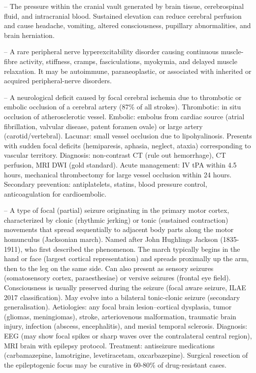 -- The pressure within the cranial vault generated by brain tissue, cerebrospinal fluid, and intracranial blood. Sustained elevation can reduce cerebral perfusion and cause headache, vomiting, altered consciousness, pupillary abnormalities, and brain herniation.

-- A rare peripheral nerve hyperexcitability disorder causing continuous muscle-fibre activity, stiffness, cramps, fasciculations, myokymia, and delayed muscle relaxation. It may be autoimmune, paraneoplastic, or associated with inherited or acquired peripheral-nerve disorders.

-- A neurological deficit caused by focal cerebral ischemia due to thrombotic or embolic occlusion of a cerebral artery (87\% of all strokes). Thrombotic: in situ occlusion of atherosclerotic vessel. Embolic: embolus from cardiac source (atrial fibrillation, valvular disease, patent foramen ovale) or large artery (carotid/vertebral). Lacunar: small vessel occlusion due to lipohyalinosis. Presents with sudden focal deficits (hemiparesis, aphasia, neglect, ataxia) corresponding to vascular territory. Diagnosis: non-contrast CT (rule out hemorrhage), CT perfusion, MRI DWI (gold standard). Acute management: IV tPA within 4.5 hours, mechanical thrombectomy for large vessel occlusion within 24 hours. Secondary prevention: antiplatelets, statins, blood pressure control, anticoagulation for cardioembolic.

-- A type of focal (partial) seizure originating in the primary motor cortex, characterized by clonic (rhythmic jerking) or tonic (sustained contraction) movements that spread sequentially to adjacent body parts along the motor homunculus (Jacksonian march). Named after John Hughlings Jackson (1835-1911), who first described the phenomenon. The march typically begins in the hand or face (largest cortical representation) and spreads proximally up the arm, then to the leg on the same side. Can also present as sensory seizures (somatosensory cortex, paraesthesiae) or versive seizures (frontal eye field). Consciousness is usually preserved during the seizure (focal aware seizure, ILAE 2017 classification). May evolve into a bilateral tonic-clonic seizure (secondary generalisation). Aetiologies: any focal brain lesion--cortical dysplasia, tumor (gliomas, meningiomas), stroke, arteriovenous malformation, traumatic brain injury, infection (abscess, encephalitis), and mesial temporal sclerosis. Diagnosis: EEG (may show focal spikes or sharp waves over the contralateral central region), MRI brain with epilepsy protocol. Treatment: antiseizure medications (carbamazepine, lamotrigine, levetiracetam, oxcarbazepine). Surgical resection of the epileptogenic focus may be curative in 60-80\% of drug-resistant cases.

